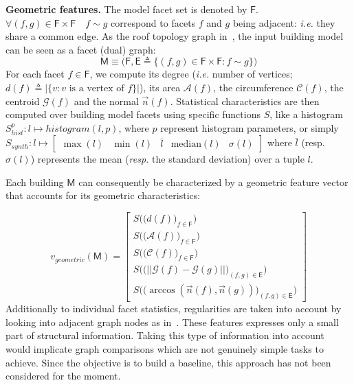 \documentclass[runningheads]{llncs}
\begin{document}
\noindent
\textbf{Geometric features.}
The model facet set is denoted by $\mathsf{F}$. $\forall (f, g) \in \mathsf{F} \times \mathsf{F} \quad f \sim g$ correspond to facets $f$ and $g$ being adjacent: \textit{i.e.} they share a common edge. As the roof topology graph in~\cite{Verma2006}, the input building model can be seen as a facet (dual) graph:
\begin{equation}
	\label{eq::model_graph}
	\mathsf{M} \equiv \Big(\mathsf{F}, \mathsf{E} \triangleq \big\{ (f, g) \in \mathsf{F} \times \mathsf{F} : f \sim g \big\} \Big)
\end{equation}
For each facet $f \in \mathsf{F}$, we compute its degree (\textit{i.e.} number of vertices; $d(f) \triangleq \vert\{v : v\text{ is a vertex of }f\}\vert$), its area $\mathscr{A}(f)$, the circumference $\mathscr{C}(f)$, the centroid $\mathscr{G}(f)$ and the normal $\vec{n}(f)$. Statistical characteristics are then computed over building model facets using specific functions $S$, like a histogram $S^p_{hist}: l \mapsto histogram(l, p)$, where $p$ represent histogram parameters, or simply $S_{synth}: l \mapsto \begin{bmatrix}
\max(l)& \min(l) & \bar{l} & \text{median}(l) & \sigma(l)
\end{bmatrix}$ where $\bar{l}$ (resp. $\sigma(l)$) represents the mean (\textit{resp.} the standard deviation) over a tuple $l$.

Each building $\mathsf{M}$ can consequently be characterized by a geometric feature vector that accounts for its geometric characteristics:

\begin{equation}
	\label{eq::geom_feat}
    v_{geometric}(\mathsf{M}) = \begin{bmatrix}
    	S \Big(\big(d(f)\big)_{f \in \mathsf{F}}\Big)\\
    	S \Big(\big(\mathscr{A}(f)\big)_{f \in \mathsf{F}}\Big)\\
    	S \Big(\big(\mathscr{C}(f)\big)_{f \in \mathsf{F}}\Big)\\
    	S \Big(\big( \vert\vert \mathscr{G}(f) - \mathscr{G}(g) \vert\vert \big)_{(f,g) \in \mathsf{E}}\Big)\\
    	S\Big(\big( \arccos(\vec{n}(f), \vec{n}(g)) \big)_{(f,g) \in \mathsf{E}}\Big)
    \end{bmatrix}
\end{equation}
Additionally to individual facet statistics, regularities are taken into account by looking into adjacent graph nodes as in~\cite{Zhou2012}. These features expresses only a small part of structural information. Taking this type of information into account would implicate graph comparisons which are not genuinely simple tasks to achieve. Since the objective is to build a baseline, this approach has not been considered for the moment.
\end{document}
